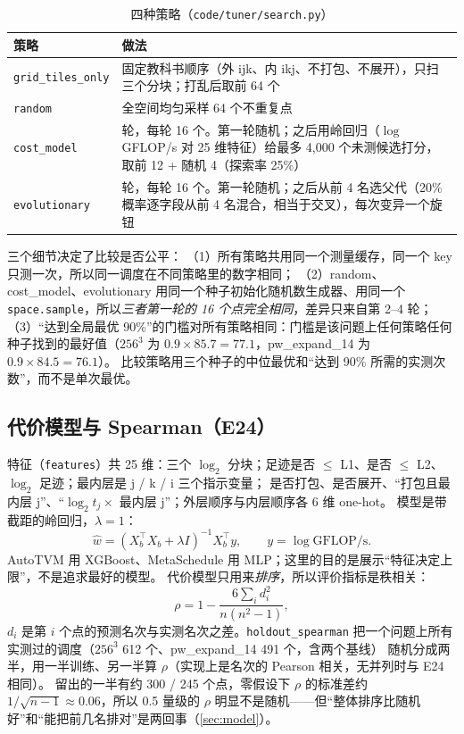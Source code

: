 \documentclass[11pt,a4paper]{ctexart}
\begin{document}
\begin{table}[H]
\centering\small
\caption{四种策略（\texttt{code/tuner/search.py}）}\label{tab:strategies}
\begin{tabularx}{\linewidth}{l >{\raggedright\arraybackslash}X}
\toprule
策略 & 做法 \\
\midrule
\texttt{grid\_tiles\_only} & 固定教科书顺序（外 ijk、内 ikj、不打包、不展开），只扫三个分块；打乱后取前 64 个 \\
\texttt{random} & 全空间均匀采样 64 个不重复点 \\
\texttt{cost\_model} & 4 轮，每轮 16 个。第一轮随机；之后用岭回归（$\log$ GFLOP/s 对 25 维特征）给最多 4,000 个未测候选打分，取前 12 + 随机 4（探索率 25\%） \\
\texttt{evolutionary} & 4 轮，每轮 16 个。第一轮随机；之后从前 4 名选父代（20\% 概率逐字段从前 4 名混合，相当于交叉），每次变异一个旋钮 \\
\bottomrule
\end{tabularx}
\end{table}

三个细节决定了比较是否公平：
（1）所有策略共用同一个测量缓存，同一个 key 只测一次，所以同一调度在不同策略里的数字相同；
（2）random、cost\_model、evolutionary 用同一个种子初始化随机数生成器、用同一个 \texttt{space.sample}，所以\emph{三者第一轮的 16 个点完全相同}，差异只来自第 2--4 轮；
（3）“达到全局最优 90\%”的门槛对所有策略相同：门槛是该问题上任何策略任何种子找到的最好值（$256^3$ 为 $0.9\times85.7=77.1$，pw\_expand\_14 为 $0.9\times84.5=76.1$）。
比较策略用三个种子的中位最优和“达到 90\% 所需的实测次数”，而不是单次最优。

\subsection{代价模型与 Spearman（E24）}\label{sec:costmodel}

特征（\texttt{features}）共 25 维：三个 $\log_2$ 分块；足迹是否 $\le$ L1、是否 $\le$ L2、$\log_2$ 足迹；最内层是 j / k / i 三个指示变量；
是否打包、是否展开、“打包且最内层 j”、“$\log_2 t_j\times$ 最内层 j”；外层顺序与内层顺序各 6 维 one-hot。
模型是带截距的岭回归，$\lambda=1$：
\[
  \hat w = (X_b^\top X_b + \lambda I)^{-1} X_b^\top y,\qquad y = \log \text{GFLOP/s}.
\]
AutoTVM 用 XGBoost、MetaSchedule 用 MLP；这里的目的是展示“特征决定上限”，不是追求最好的模型。
代价模型只用来\emph{排序}，所以评价指标是秩相关：
\begin{equation*}\label{eq:spearman}
  \rho = 1 - \frac{6\sum_i d_i^2}{n(n^2-1)}, \tag{E24}
\end{equation*}
$d_i$ 是第 $i$ 个点的预测名次与实测名次之差。\texttt{holdout\_spearman} 把一个问题上所有实测过的调度（$256^3$ 612 个、pw\_expand\_14 491 个，含两个基线）
随机分成两半，用一半训练、另一半算 $\rho$（实现上是名次的 Pearson 相关，无并列时与 E24 相同）。
留出的一半有约 300 / 245 个点，零假设下 $\rho$ 的标准差约 $1/\sqrt{n-1}\approx0.06$，所以 0.5 量级的 $\rho$ 明显不是随机——但“整体排序比随机好”和“能把前几名排对”是两回事（\cref{sec:model}）。
\end{document}
